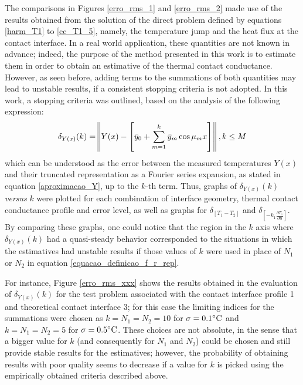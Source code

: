 \documentclass[12pt]{CHT-20}
\begin{document}
The comparisons in Figures \ref{erro_rms_1} and \ref{erro_rms_2} made use of the results obtained from the solution of the direct problem defined by equations \eqref{harm_T1} to \eqref{cc_T1_5}, namely, the temperature jump and the heat flux at the contact interface. In a real world application, these quantities are not known in advance; indeed, the purpose of the method presented in this work is to estimate them in order to obtain an estimative of the thermal contact conductance. However, as seen before, adding terms to the summations of both quantities may lead to unstable results, if a consistent stopping criteria is not adopted. In this work, a stopping criteria was outlined, based on the analysis of the following expression:
\begin{align}
\delta_{Y(x)}(k) = \norm{Y(x) - \left[\bar{y}_0 + \sum_{m=1}^k \bar{y}_m \cos\mu_m x \right]} , k \le M \label{aproximacao_Y_2}
\end{align}
which can be understood as the error between the measured temperatures $Y(x)$ and their truncated representation as a Fourier series expansion, as stated in equation \eqref{aproximacao_Y}, up to the $k$-th term. Thus, graphs of $\delta_{Y(x)}(k)$ \textit{versus} $k$ were plotted for each combination of interface geometry, thermal contact conductance profile and error level, as well as graphs for $\delta_{[T_1 - T_2]}$ and $\delta_{\left[-k_1 \frac{\partial T_1}{\partial \mathbf{n}}\right]}$. By comparing these graphs, one could notice that the region in the $k$ axis where $\delta_{Y(x)}(k)$ had a quasi-steady behavior corresponded to the situations in which the estimatives had unstable results if those values of $k$ were used in place of $N_1$ or $N_2$ in equation \eqref{equacao_definicao_f_r_rep}. 

For instance, Figure \ref{erro_rms_xxx} shows the results obtained in the evaluation of $\delta_{Y(x)}(k)$ for the test problem associated with the contact interface profile 1 and theoretical contact interface 3; for this case the limiting indices for the summations were chosen as $k=N_1=N_2=10$ for $\sigma = 0.1\celsius$ and $k=N_1=N_2=5$ for $\sigma = 0.5\celsius$. These choices are not absolute, in the sense that a bigger value for $k$ (and consequently for $N_1$ and $N_2$) could be chosen and still provide stable results for the estimatives; however, the probability of obtaining results with poor quality seems to decrease if a value for $k$ is picked using the empirically obtained criteria described above.
\end{document}
